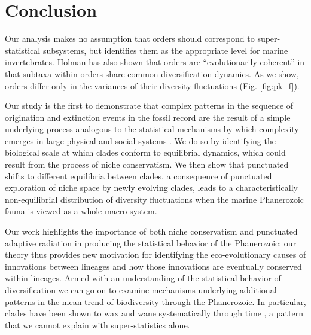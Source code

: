 \section{Conclusion}

Our analysis makes no assumption that orders should correspond to
super-statistical subsystems, but identifies them as the appropriate
level for marine invertebrates. Holman \citep{holman1989} has also
shown that orders are ``evolutionarily coherent'' in that subtaxa
within orders share common diversification dynamics. As we show,
orders differ only in the variances of their diversity fluctuations
(Fig. \ref{fig:pk_f}).

Our study is the first to demonstrate that complex patterns in the
sequence of origination and extinction events in the fossil record are
the result of a simple underlying process analogous to the statistical
mechanisms by which complexity emerges in large physical
\citep{beck2004} and social systems \citep{fuentes2009}.  We do so by
identifying the biological scale at which clades conform to
equilibrial dynamics, which could result from the process of niche
conservatism. We then show that punctuated shifts to different
equilibria between clades, a consequence of punctuated exploration of
niche space by newly evolving clades, leads to a characteristically
non-equilibrial distribution of diversity fluctuations when the marine
Phanerozoic fauna is viewed as a whole macro-system.

Our work highlights the importance of both niche conservatism and
punctuated adaptive radiation in producing the statistical behavior of
the Phanerozoic; our theory thus provides new motivation for
identifying the eco-evolutionary causes of innovations between
lineages and how those innovations are eventually conserved within
lineages. Armed with an understanding of the statistical behavior of
diversification we can go on to examine mechanisms underlying
additional patterns in the mean trend of biodiversity through the
Phanerozoic. In particular, clades have been shown to wax and wane
systematically through time \citep{liow2007,
  quental2013}, a pattern that we cannot explain with super-statistics
alone.


